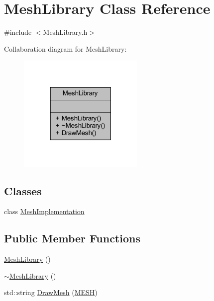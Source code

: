 \hypertarget{class_mesh_library}{}\section{Mesh\+Library Class Reference}
\label{class_mesh_library}


{\ttfamily \#include $<$Mesh\+Library.\+h$>$}



Collaboration diagram for Mesh\+Library\+:
\nopagebreak
\begin{figure}[H]
\begin{center}
\leavevmode
\includegraphics[width=171pt]{class_mesh_library__coll__graph}
\end{center}
\end{figure}
\subsection*{Classes}
\begin{DoxyCompactItemize}
\item 
class \mbox{\hyperlink{class_mesh_library_1_1_mesh_implementation}{Mesh\+Implementation}}
\end{DoxyCompactItemize}
\subsection*{Public Member Functions}
\begin{DoxyCompactItemize}
\item 
\mbox{\hyperlink{class_mesh_library_a263ef8b969d1b09956513de048488082}{Mesh\+Library}} ()
\item 
\mbox{\hyperlink{class_mesh_library_ac6429ef7e113e35a9b1276ad362f81c7}{$\sim$\+Mesh\+Library}} ()
\item 
std\+::string \mbox{\hyperlink{class_mesh_library_a1b79057329cc89dfa7616fe7aa48fe42}{Draw\+Mesh}} (\mbox{\hyperlink{_p_i_m_p_l_2_p_i_m_p_l_2_commons_8h_a7d8bc2c54c2771e646f020b8420adafc}{M\+E\+SH}})
\end{DoxyCompactItemize}


